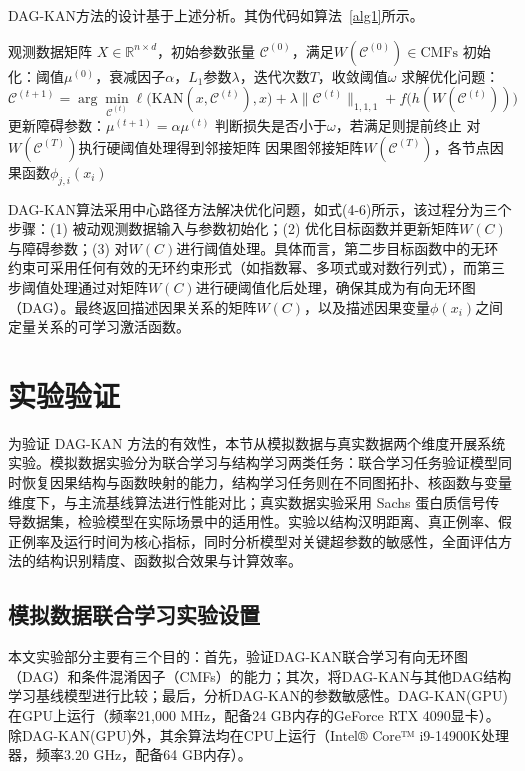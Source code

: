 DAG-KAN方法的设计基于上述分析。其伪代码如算法~\ref{alg1}所示。
\begin{algorithm}
	\caption{DAG-KAN算法}
	\label{alg1}
	\begin{algorithmic}[1]
		\REQUIRE 观测数据矩阵 $X\in\mathbb{R}^{n\times d}$，初始参数张量 $\mathcal{C}^{(0)}$，满足$W(\mathcal{C}^{(0)})\in \text{CMFs}$
		\STATE 初始化：阈值$\mu^{(0)}$，衰减因子$\alpha$，$L_1$参数$\lambda$，迭代次数$T$，收敛阈值$\omega$
		\STATE 求解优化问题：
		\[
		\mathcal{C}^{(t+1)}=\arg\min_{\mathcal{C}^{(t)}}
		\ell\big(\mathrm{KAN}(x,\mathcal{C}^{(t)}),x\big)
		+\lambda \|\mathcal{C}^{(t)}\|_{1,1,1}
		+f\big(h(W(\mathcal{C}^{(t)}))\big)
		\]
		\STATE 更新障碍参数：$\mu^{(t+1)}=\alpha \mu^{(t)}$
		\STATE 判断损失是否小于$\omega$，若满足则提前终止
		\ENDFOR
		\STATE 对$W(\mathcal{C}^{(T)})$执行硬阈值处理得到邻接矩阵
		\ENSURE 因果图邻接矩阵$W(\mathcal{C}^{(T)})$，各节点因果函数$\phi_{j,i}(x_i)$
	\end{algorithmic}
\end{algorithm}

DAG-KAN算法采用中心路径方法解决优化问题，如式(4-6)所示，该过程分为三个步骤：(1) 被动观测数据输入与参数初始化；(2) 优化目标函数并更新矩阵$W\left( C \right) $与障碍参数；(3) 对$W\left( C \right) $进行阈值处理。具体而言，第二步目标函数中的无环约束可采用任何有效的无环约束形式（如指数幂、多项式或对数行列式），而第三步阈值处理通过对矩阵$W\left( C \right) $进行硬阈值化后处理，确保其成为有向无环图（DAG）。最终返回描述因果关系的矩阵$W\left( C \right) $，以及描述因果变量$\phi(x_i)$之间定量关系的可学习激活函数。

\section{实验验证}
为验证 DAG-KAN 方法的有效性，本节从模拟数据与真实数据两个维度开展系统实验。模拟数据实验分为联合学习与结构学习两类任务：联合学习任务验证模型同时恢复因果结构与函数映射的能力，结构学习任务则在不同图拓扑、核函数与变量维度下，与主流基线算法进行性能对比；真实数据实验采用 Sachs 蛋白质信号传导数据集，检验模型在实际场景中的适用性。实验以结构汉明距离、真正例率、假正例率及运行时间为核心指标，同时分析模型对关键超参数的敏感性，全面评估方法的结构识别精度、函数拟合效果与计算效率。

\subsection{模拟数据联合学习实验设置}\label{initialization}
本文实验部分主要有三个目的：首先，验证DAG-KAN联合学习有向无环图（DAG）和条件混淆因子（CMFs）的能力；其次，将DAG-KAN与其他DAG结构学习基线模型进行比较；最后，分析DAG-KAN的参数敏感性。DAG-KAN(GPU)在GPU上运行（频率21,000 MHz，配备24 GB内存的GeForce RTX 4090显卡）。除DAG-KAN(GPU)外，其余算法均在CPU上运行（Intel® Core™ i9-14900K处理器，频率3.20 GHz，配备64 GB内存）。

